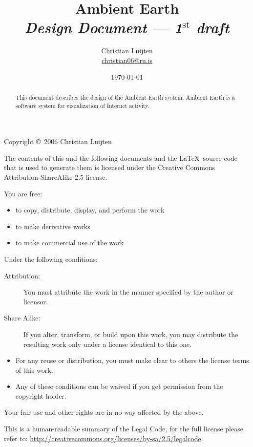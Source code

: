 \documentclass[english,a4paper,twoside]{scrreprt}
\title{Ambient Earth\\
       {\Large \emph{Design Document --- 1$^{\text{st}}$ draft\/}}}
\author{Christian Luijten\\\url{christian06@ru.is}}
\date{\today}
\begin{document}
\maketitle

\begin{abstract}
  This document describes the design of the Ambient Earth system. Ambient Earth
  is a software system for visualization of Internet activity.
\end{abstract}

\vfill

{\small
  Copyright \copyright\ 2006 Christian Luijten

  The contents of this and the following documents and the \LaTeX\ source
  code that is used to generate them is licensed under the Creative Commons
  Attribution-ShareAlike 2.5 license. 

  You are free:
  \begin{itemize}
    \item to copy, distribute, display, and perform the work
    \item to make derivative works
    \item to make commercial use of the work
  \end{itemize}

  Under the following conditions:
  \begin{description}
    \item[Attribution:] You must attribute the work in the manner specified by
      the author or licensor.
    \item[Share Alike:] If you alter, transform, or build upon this work, you
      may distribute the resulting work only under a license identical to this
      one.
  \end{description}

  \begin{itemize}
    \item For any reuse or distribution, you must make clear to others the
      license terms of this work.
    \item Any of these conditions can be waived if you get permission from
      the copyright holder.
  \end{itemize}

  Your fair use and other rights are in no way affected by the above.

  This is a human-readable summary of the Legal Code, for the full license
  please refer to:
  \mbox{\url{http://creativecommons.org/licenses/by-sa/2.5/legalcode}}.

}

\newpage

\tableofcontents











% 




\end{document}
